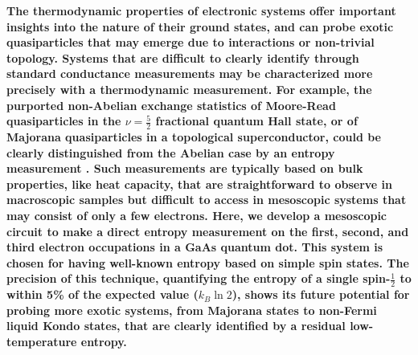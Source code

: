 \documentclass[twocolumn,showpacs,amsmath,amssymb,prl,aps,superscriptaddress]{revtex4-1}
\begin{document}
%
%

\maketitle

\textbf{The thermodynamic properties of electronic systems offer important insights into the nature of their ground states, and can probe exotic quasiparticles that may emerge due to interactions or non-trivial topology.  Systems that are difficult to clearly identify through standard conductance measurements may be characterized more precisely with a thermodynamic measurement. For example, the purported non-Abelian exchange statistics of Moore-Read quasiparticles in the $\nu = \frac{5}{2}$ fractional quantum Hall state, or of Majorana quasiparticles in a topological superconductor, could be clearly distinguished from the Abelian case by an entropy measurement \cite{Cooper2009, Smirnov2015}.  Such measurements are typically based on bulk properties, like heat capacity, that are straightforward to observe in macroscopic samples but difficult to access in mesoscopic systems that may consist of only a few electrons.  Here, we develop a mesoscopic circuit to make a direct entropy measurement on the first, second, and third electron occupations in a GaAs quantum dot.  This system is chosen for having well-known entropy based on simple spin states\cite{Tarucha1996, Ciorga2000, Duncan2000, Lindemann2002, Potok2003, Hofmann2016}.  The precision of this technique, quantifying the entropy of a single spin-$\frac{1}{2}$ to within 5\% of the expected value ($k_B \ln{2}$), shows its future potential for probing more exotic systems, from Majorana states to non-Fermi liquid Kondo states, that are clearly identified by a residual low-temperature entropy\cite{Alkurtass2016}.}
\end{document}
